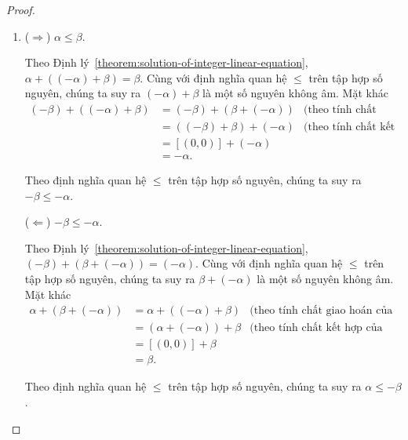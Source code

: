 \begin{proof}
	\begin{enumerate}[label={(\roman*)}]
		\item ($\Rightarrow$) $\alpha\leq\beta$.

		      Theo Định lý~\ref{theorem:solution-of-integer-linear-equation}, $\alpha + ((-\alpha) + \beta) = \beta$. Cùng với định nghĩa quan hệ $\leq$ trên tập hợp số nguyên, chúng ta suy ra $(-\alpha) + \beta$ là một số nguyên không âm. Mặt khác
		      \begin{align*}
			      (-\beta) + ((-\alpha) + \beta) & = (-\beta) + (\beta + (-\alpha)) & \text{(theo tính chất giao hoán của phép cộng số nguyên)} \\
			                                     & = ((-\beta) + \beta) + (-\alpha) & \text{(theo tính chất kết hợp của phép cộng số nguyên)}   \\
			                                     & = [(0,0)] + (-\alpha)                                                                        \\
			                                     & = -\alpha.
		      \end{align*}

		      Theo định nghĩa quan hệ $\leq$ trên tập hợp số nguyên, chúng ta suy ra $-\beta\leq -\alpha$.

		      ($\Leftarrow$) $-\beta\leq -\alpha$.

		      Theo Định lý~\ref{theorem:solution-of-integer-linear-equation}, $(-\beta) + (\beta + (-\alpha)) = (-\alpha)$. Cùng với định nghĩa quan hệ $\leq$ trên tập hợp số nguyên, chúng ta suy ra $\beta + (-\alpha)$ là một số nguyên không âm. Mặt khác
		      \begin{align*}
			      \alpha + (\beta + (-\alpha)) & = \alpha + ((-\alpha) + \beta) & \text{(theo tính chất giao hoán của phép cộng hai số nguyên)} \\
			                                   & = (\alpha + (-\alpha)) + \beta & \text{(theo tính chất kết hợp của phép cộng hai số nguyên)}   \\
			                                   & = [(0,0)] + \beta                                                                              \\
			                                   & = \beta.
		      \end{align*}

		      Theo định nghĩa quan hệ $\leq$ trên tập hợp số nguyên, chúng ta suy ra $\alpha\leq -\beta$.


\end{enumerate}
\end{proof}

